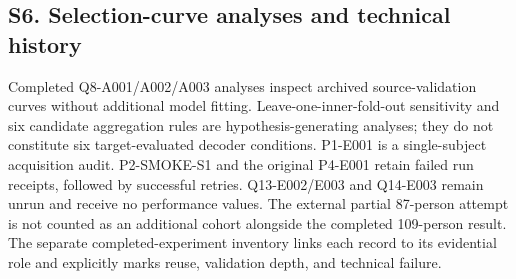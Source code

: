 \documentclass[11pt]{article}
\begin{document}
\subsection*{S6. Selection-curve analyses and technical history}
Completed Q8-A001/A002/A003 analyses inspect archived source-validation curves without additional model fitting. Leave-one-inner-fold-out sensitivity and six candidate aggregation rules are hypothesis-generating analyses; they do not constitute six target-evaluated decoder conditions. P1-E001 is a single-subject acquisition audit. P2-SMOKE-S1 and the original P4-E001 retain failed run receipts, followed by successful retries. Q13-E002/E003 and Q14-E003 remain unrun and receive no performance values. The external partial 87-person attempt is not counted as an additional cohort alongside the completed 109-person result. The separate completed-experiment inventory links each record to its evidential role and explicitly marks reuse, validation depth, and technical failure.
\end{document}
